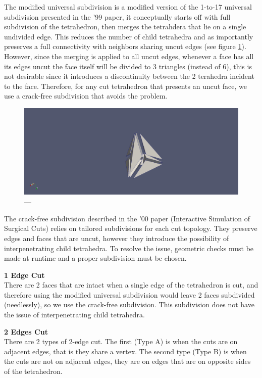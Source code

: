 The modified universal subdivision is a modified version of the 1-to-17 universal subdivision presented in the '99 paper, it conceptually starts off with full subdivision of the tetrahedron, then merges the tetrahdera that lie on a single undivided edge. This reduces the number of child tetrahedra and as importantly preserves a full connectivity with neighbors sharing uncut edges (see figure \ref{fig:Merged_universal_subdivision}). However, since the merging is applied to all uncut edges, whenever a face has all its edges uncut the face itself will be divided to 3 triangles (instead of 6), this is not desirable since it introduces a discontinuity between the 2 terahedra incident to the face. Therefore, for any cut tetrahedron that presents an uncut face, we use a crack-free subdivision that avoids the problem.

\begin{figure}
  \centering%
  \includegraphics[width=0.85\linewidth]{figures/cutting/Merged_universal.png}
  \caption{---}\label{fig:Merged_universal_subdivision}
\end{figure}

The crack-free subdivision described in the '00 paper (Interactive Simulation of Surgical Cuts) relies on tailored subdivisions for each cut topology. They preserve edges and faces that are uncut, however they introduce the possibility of interpenetrating child tetrahedra. To resolve the issue, geometric checks must be made at runtime and a proper subdivision must be chosen.

\textbf{1 Edge Cut}\\
There are 2 faces that are intact when a single edge of the tetrahedron is cut, and therefore using the modified universal subdivision would leave 2 faces subdivided (needlessly), so we use the crack-free subdivision. This subdivision does not have the issue of interpenetrating child tetrahedra.

\textbf{2 Edges Cut}\\
There are 2 types of 2-edge cut. The first (Type A) is when the cuts are on adjacent edges, that is they share a vertex. The second type (Type B) is when the cuts are not on adjacent edges, they are on edges that are on opposite sides of the tetrahedron.

